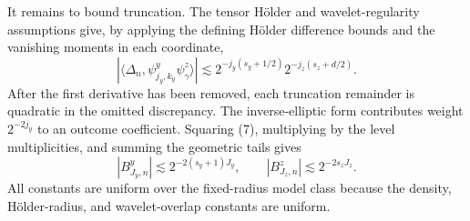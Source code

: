It remains to bound truncation.  The tensor H\"older and wavelet-regularity assumptions give, by applying the defining H\"older difference bounds and the vanishing moments in each coordinate,
\[
|\langle\Delta_n,\psi^y_{j_y,k_y}\psi^z_\gamma\rangle|
\lesssim2^{-j_y(s_y+1/2)}2^{-j_z(s_z+d/2)}.                                \tag{7}
\]
After the first derivative has been removed, each truncation remainder is quadratic in the omitted discrepancy.  The inverse-elliptic form contributes weight \(2^{-2j_y}\) to an outcome coefficient.  Squaring (7), multiplying by the level multiplicities, and summing the geometric tails gives
\[
|B^y_{J_y,n}|\lesssim2^{-2(s_y+1)J_y},\qquad
|B^z_{J_z,n}|\lesssim2^{-2s_zJ_z}.
\]
All constants are uniform over the fixed-radius model class because the density, H\"older-radius, and wavelet-overlap constants are uniform.